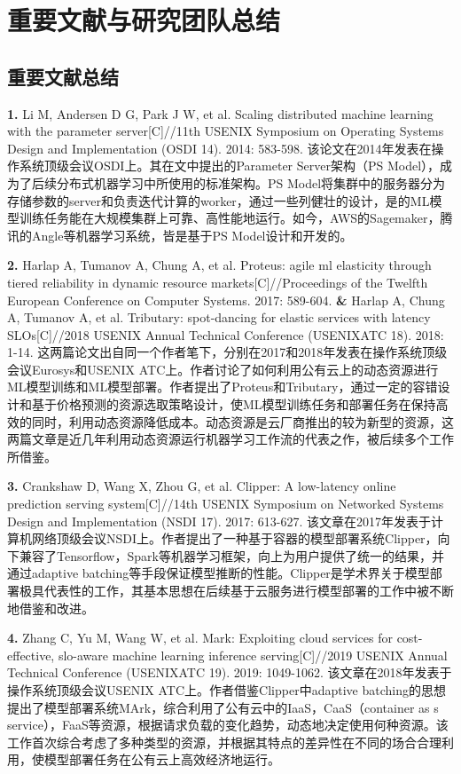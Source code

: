 \chapter{重要文献与研究团队总结}

\section{重要文献总结}
\textbf{1. }Li M, Andersen D G, Park J W, et al. Scaling distributed machine learning with the parameter server[C]//11th {USENIX} Symposium on Operating Systems Design and Implementation ({OSDI} 14). 2014: 583-598. 该论文在2014年发表在操作系统顶级会议OSDI上。其在文中提出的Parameter Server架构（PS Model），成为了后续分布式机器学习中所使用的标准架构。PS Model将集群中的服务器分为存储参数的server和负责迭代计算的worker，通过一些列健壮的设计，是的ML模型训练任务能在大规模集群上可靠、高性能地运行。如今，AWS的Sagemaker\parencite{joshi2020amazon}，腾讯的Angle等机器学习系统，皆是基于PS Model设计和开发的。

\textbf{2. }Harlap A, Tumanov A, Chung A, et al. Proteus: agile ml elasticity through tiered reliability in dynamic resource markets[C]//Proceedings of the Twelfth European Conference on Computer Systems. 2017: 589-604. \textbf{\&} Harlap A, Chung A, Tumanov A, et al. Tributary: spot-dancing for elastic services with latency SLOs[C]//2018 {USENIX} Annual Technical Conference ({USENIX}{ATC} 18). 2018: 1-14. 这两篇论文出自同一个作者笔下，分别在2017和2018年发表在操作系统顶级会议Eurosys和USENIX ATC上。作者讨论了如何利用公有云上的动态资源进行ML模型训练和ML模型部署。作者提出了Proteus和Tributary，通过一定的容错设计和基于价格预测的资源选取策略设计，使ML模型训练任务和部署任务在保持高效的同时，利用动态资源降低成本。动态资源是云厂商推出的较为新型的资源，这两篇文章是近几年利用动态资源运行机器学习工作流的代表之作，被后续多个工作\parencite{li2020spottune}所借鉴。

\textbf{3. }Crankshaw D, Wang X, Zhou G, et al. Clipper: A low-latency online prediction serving system[C]//14th {USENIX} Symposium on Networked Systems Design and Implementation ({NSDI} 17). 2017: 613-627. 该文章在2017年发表于计算机网络顶级会议NSDI上。作者提出了一种基于容器的模型部署系统Clipper，向下兼容了Tensorflow，Spark等机器学习框架，向上为用户提供了统一的结果，并通过adaptive batching等手段保证模型推断的性能。Clipper是学术界关于模型部署极具代表性的工作，其基本思想在后续基于云服务进行模型部署的工作中\parencite{zhang2019mark}被不断地借鉴和改进。

\textbf{4. }Zhang C, Yu M, Wang W, et al. Mark: Exploiting cloud services for cost-effective, slo-aware machine learning inference serving[C]//2019 {USENIX} Annual Technical Conference ({USENIX}{ATC} 19). 2019: 1049-1062. 该文章在2018年发表于操作系统顶级会议USENIX ATC上。作者借鉴Clipper中adaptive batching的思想提出了模型部署系统MArk，综合利用了公有云中的IaaS，CaaS（container as s service），FaaS等资源，根据请求负载的变化趋势，动态地决定使用何种资源。该工作首次综合考虑了多种类型的资源，并根据其特点的差异性在不同的场合合理利用，使模型部署任务在公有云上高效经济地运行。

